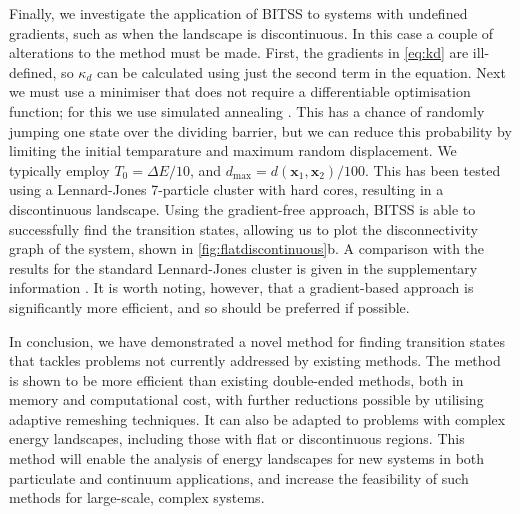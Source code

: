 \documentclass[aps,prl,twocolumn,10pt,groupedaddress]{revtex4-2}
\begin{document}
Finally, we investigate the application of BITSS to systems with undefined gradients, such as when the landscape is discontinuous.
In this case a couple of alterations to the method must be made.
First, the gradients in \cref{eq:kd} are ill-defined, so $\kappa_d$ can be calculated using just the second term in the equation.
Next we must use a minimiser that does not require a differentiable optimisation function; for this we use simulated annealing \cite{Kirkpatrick1983}.
This has a chance of randomly jumping one state over the dividing barrier, but we can reduce this probability by limiting the initial temparature and maximum random displacement. We typically employ $T_0 = \Delta E / 10$, and $d_\text{max} = d(\bm{x}_1, \bm{x}_2) / 100$.
This has been tested using a Lennard-Jones 7-particle cluster with hard cores, resulting in a discontinuous landscape.
Using the gradient-free approach, BITSS is able to successfully find the transition states, allowing us to plot the disconnectivity graph of the system, shown in \cref{fig:flatdiscontinuous}b.
A comparison with the results for the standard Lennard-Jones cluster is given in the supplementary information \cite{Note1}.
It is worth noting, however, that a gradient-based approach is significantly more efficient, and so should be preferred if possible.


In conclusion, we have demonstrated a novel method for finding transition states that tackles problems not currently addressed by existing methods.
The method is shown to be more efficient than existing double-ended methods, both in memory and computational cost, with further reductions possible by utilising adaptive remeshing techniques.
It can also be adapted to problems with complex energy landscapes, including those with flat or discontinuous regions.
This method will enable the analysis of energy landscapes for new systems in both particulate and continuum applications, and increase the feasibility of such methods for large-scale, complex systems.


\appendix
\section{}
\end{document}
